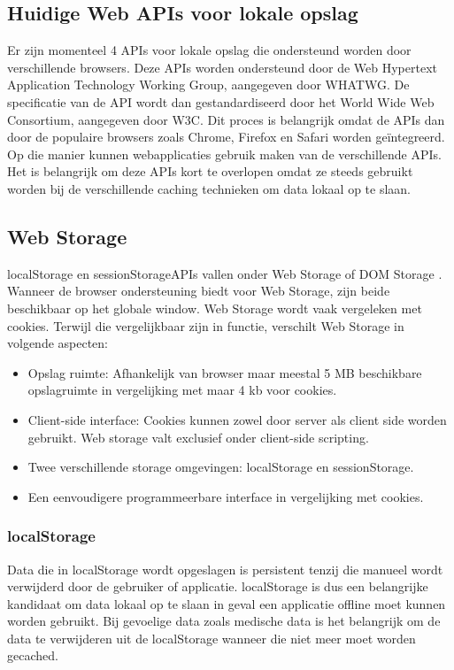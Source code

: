 \subsection{Huidige Web APIs voor lokale opslag}
Er zijn momenteel 4 APIs \autocite{mozilla-overview} voor lokale opslag die ondersteund worden door verschillende browsers. Deze APIs worden ondersteund \autocite{WHATWG-storage-API} door de Web Hypertext Application Technology Working Group, aangegeven door WHATWG. De specificatie van de API wordt dan gestandardiseerd door het World Wide Web Consortium, aangegeven door W3C. Dit proces is belangrijk omdat de APIs dan door de populaire browsers zoals Chrome, Firefox en Safari worden ge\"integreerd. Op die manier kunnen webapplicaties gebruik maken van de verschillende APIs. Het is belangrijk om deze APIs kort te overlopen omdat ze steeds gebruikt worden bij de verschillende caching technieken om data lokaal op te slaan.
\subsection{Web Storage}
localStorage en sessionStorageAPIs vallen onder Web Storage of DOM Storage \autocite{clientside-storage}. Wanneer de browser ondersteuning biedt voor Web Storage, zijn beide beschikbaar op het globale window. Web Storage wordt vaak vergeleken met cookies. Terwijl die vergelijkbaar zijn in functie, verschilt Web Storage in volgende aspecten: 
\begin{itemize}  
\item Opslag ruimte: Afhankelijk van browser maar meestal 5 MB beschikbare opslagruimte in vergelijking met maar 4 kb voor cookies.
\item Client-side interface: Cookies kunnen zowel door server als client side worden gebruikt. Web storage valt exclusief onder client-side scripting.
\item Twee verschillende storage omgevingen: localStorage en sessionStorage.
\item Een eenvoudigere programmeerbare interface in vergelijking met cookies.
\end{itemize}
\clearpage
\subsubsection{localStorage}
Data die in localStorage wordt opgeslagen is persistent tenzij die manueel wordt verwijderd door de gebruiker of applicatie. localStorage is dus een belangrijke kandidaat om data lokaal op te slaan in geval een applicatie offline moet kunnen worden gebruikt. Bij gevoelige data zoals medische data is het belangrijk om de data te verwijderen uit de localStorage wanneer die niet meer moet worden gecached.
